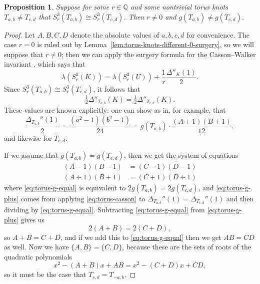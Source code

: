 \documentclass[11pt]{amsart}
\newtheorem {proposition}[theorem]{Proposition}
\numberwithin{equation}{section}
\numberwithin{theorem}{section}
\theoremstyle{definition}
\newcommand{\Q}{\mathbb{Q}}
\begin{document}
\begin{proposition} \label{prop:compare-torus-surgeries}
Suppose for some $r \in \Q$ and some nontrivial torus knots $T_{a,b} \neq T_{c,d}$ that $S^3_r(T_{a,b}) \cong S^3_r(T_{c,d})$.  Then $r\neq 0$ and $g(T_{a,b}) \neq g(T_{c,d})$.
\end{proposition}

\begin{proof}
Let $A,B,C,D$ denote the absolute values of $a,b,c,d$ for convenience.  The case $r=0$ is ruled out by Lemma~\ref{lem:torus-knots-different-0-surgery}, so we will suppose that $r \neq 0$; then we can apply the surgery formula for the Casson--Walker invariant \cite{walker}, which says that
\[ \lambda(S^3_r(K)) = \lambda(S^3_r(U)) + \frac{1}{r}\frac{\Delta''_K(1)}{2}. \]
Since $S^3_r(T_{a,b}) \cong S^3_r(T_{c,d})$, it follows that
\[ \tfrac{1}{2}\Delta''_{T_{a,b}}(K) = \tfrac{1}{2}\Delta''_{T_{c,d}}(K). \]
These values are known explicitly: one can show as in, for example, \cite[Appendix~A]{mccoy-pretzel} that
\begin{equation} \label{eq:torus-casson}
\frac{\Delta_{T_{a,b}}''(1)}{2} = \frac{(a^2-1)(b^2-1)}{24} = g(T_{a,b}) \cdot \frac{(A+1)(B+1)}{12},
\end{equation}
and likewise for $T_{c,d}$.

If we assume that $g(T_{a,b}) = g(T_{c,d})$, then we get the system of equations
\begin{align}
(A-1)(B-1) &= (C-1)(D-1) \label{eq:torus-g-equal} \\
(A+1)(B+1) &= (C+1)(D+1) \label{eq:torus-g-plus}
\end{align}
where \eqref{eq:torus-g-equal} is equivalent to $2g(T_{a,b})=2g(T_{c,d})$, and \eqref{eq:torus-g-plus} comes from applying \eqref{eq:torus-casson} to $\Delta_{T_{a,b}}''(1) = \Delta_{T_{c,d}}''(1)$ and then dividing by \eqref{eq:torus-g-equal}.  Subtracting \eqref{eq:torus-g-equal} from \eqref{eq:torus-g-plus} gives us
\[ 2(A+B) = 2(C+D), \]
so $A+B=C+D$, and if we add this to \eqref{eq:torus-g-equal} then we get $AB=CD$ as well.  Now we have $\{A,B\} = \{C,D\}$, because these are the sets of roots of the quadratic polynomials
\[ x^2 - (A+B)x + AB = x^2 - (C+D)x + CD, \]
so it must be the case that $T_{c,d} = T_{-a,b}$.


\end{proof}
\end{document}
